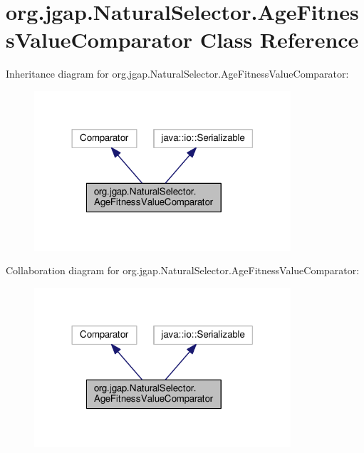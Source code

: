 \hypertarget{classorg_1_1jgap_1_1_natural_selector_1_1_age_fitness_value_comparator}{\section{org.\-jgap.\-Natural\-Selector.\-Age\-Fitness\-Value\-Comparator Class Reference}
\label{classorg_1_1jgap_1_1_natural_selector_1_1_age_fitness_value_comparator}
}


Inheritance diagram for org.\-jgap.\-Natural\-Selector.\-Age\-Fitness\-Value\-Comparator\-:
\nopagebreak
\begin{figure}[H]
\begin{center}
\leavevmode
\includegraphics[width=270pt]{classorg_1_1jgap_1_1_natural_selector_1_1_age_fitness_value_comparator__inherit__graph}
\end{center}
\end{figure}


Collaboration diagram for org.\-jgap.\-Natural\-Selector.\-Age\-Fitness\-Value\-Comparator\-:
\nopagebreak
\begin{figure}[H]
\begin{center}
\leavevmode
\includegraphics[width=270pt]{classorg_1_1jgap_1_1_natural_selector_1_1_age_fitness_value_comparator__coll__graph}
\end{center}
\end{figure}

